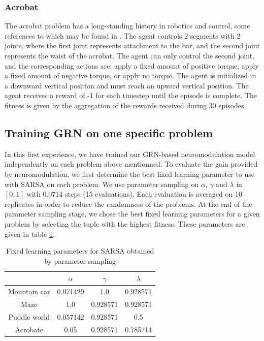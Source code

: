 \subsubsection{Acrobat}

The acrobat problem has a long-standing history in robotics and control, some references to which may be found in \cite{sutton1998introduction}. The agent controls 2 segments with 2 joints, where the first joint represents attachment to the bar, and the second joint represents the waist of the acrobat. The agent can only control the second joint, and the corresponding actions are: apply a fixed amount of positive torque, apply a fixed amount of negative torque, or apply no torque. The agent is initialized in a downward vertical position and must reach an upward vertical position. The agent receives a reward of -1 for each timestep until the episode is complete. The fitness is given by the aggregation of the rewards received during 30 episodes.

\subsection{Training GRN on one specific problem}
In this first experience, we have trained our GRN-based neuromodulation model independently on each problem above mentionned. To evaluate the gain provided by neuromodulation, we first determine the best fixed learning parameter to use with SARSA on each problem. We use parameter sampling on $\alpha$, $\gamma$ and $\lambda$ in $[0, 1]$ with 0.0714 steps (15 evaluations). Each evaluation is averaged on 10 replicates in order to reduce the randomness of the problems. At the end of the parameter sampling stage, we chose the best fixed learning parameters for a given problem by selecting the tuple with the highest fitness. These parameters are given in table \ref{tab:SARSAFixedParams}.

\begin{table}[h]
\center
\begin{tabular}{|c|ccc|}
\cline{2-4}
\multicolumn{1}{c|}{ }	& $\alpha$	& $\gamma$	& $\lambda$	\\\hline
Mountain car			& 0.071429	& 1.0		& 0.928571 	\\%
Maze				& 1.0		& 0.928571	& 0.928571	\\%
Puddle world			&  0.057142	& 0.928571	& 0.5		\\%
Acrobate				& 0.05		& 0.928571	& 0.785714	\\\hline
\end{tabular}
\caption{Fixed learning parameters for SARSA obtained by parameter sampling}\label{tab:SARSAFixedParams}
\end{table}

